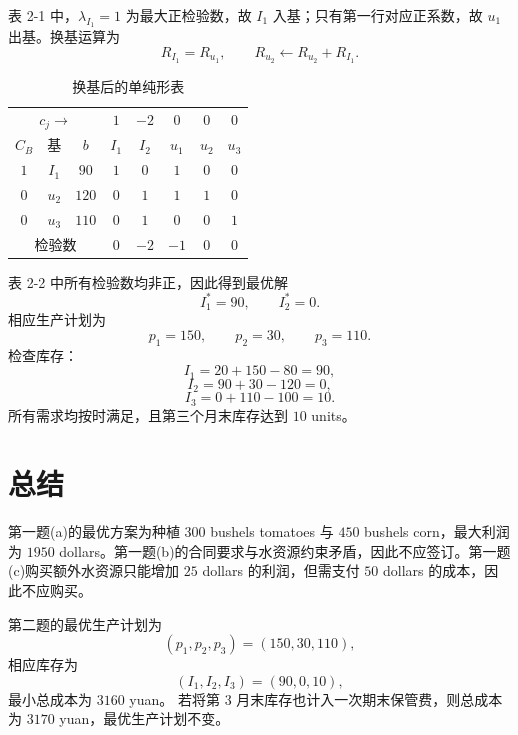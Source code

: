﻿\documentclass[UTF8,zihao=-4,fontset=none]{ctexart}
\begin{document}
表 2-1 中，\(\lambda_{I_1}=1\) 为最大正检验数，故 \(I_1\) 入基；只有第一行对应正系数，故 \(u_1\) 出基。换基运算为
\[
    R_{I_1}=R_{u_1},\qquad R_{u_2}\leftarrow R_{u_2}+R_{I_1}.
\]

\begin{table}[H]
\centering
{}
\setlength{\tabcolsep}{4pt}
\caption{换基后的单纯形表}
\begin{tabular}{cccccccc}
\toprule
\multicolumn{3}{c}{$c_j\rightarrow$} & \(1\) & \(-2\) & \(0\) & \(0\) & \(0\)\\
\(C_B\) & 基 & \(b\) & \(I_1\) & \(I_2\) & \(u_1\) & \(u_2\) & \(u_3\)\\
\midrule
\(1\) & \(I_1\) & \(90\)  & \(1\) & \(0\) & \(1\) & \(0\) & \(0\)\\
\(0\) & \(u_2\) & \(120\) & \(0\) & \(1\) & \(1\) & \(1\) & \(0\)\\
\(0\) & \(u_3\) & \(110\) & \(0\) & \(1\) & \(0\) & \(0\) & \(1\)\\
\multicolumn{3}{c}{检验数} & \(0\) & \(-2\) & \(-1\) & \(0\) & \(0\)\\
\bottomrule
\end{tabular}
\end{table}

表 2-2 中所有检验数均非正，因此得到最优解
\[
    I_1^*=90,\qquad I_2^*=0.
\]
相应生产计划为
\[
    p_1=150,\qquad p_2=30,\qquad p_3=110.
\]
检查库存：
\[
    I_1=20+150-80=90,
\]
\[
    I_2=90+30-120=0,
\]
\[
    I_3=0+110-100=10.
\]
所有需求均按时满足，且第三个月末库存达到 \(10\) units。

\section*{总结}

第一题(a)的最优方案为种植 \(300\) bushels tomatoes 与 \(450\) bushels corn，最大利润为 \(1950\) dollars。第一题(b)的合同要求与水资源约束矛盾，因此不应签订。第一题(c)购买额外水资源只能增加 \(25\) dollars 的利润，但需支付 \(50\) dollars 的成本，因此不应购买。

第二题的最优生产计划为
\[
    (p_1,p_2,p_3)=(150,30,110),
\]
相应库存为
\[
    (I_1,I_2,I_3)=(90,0,10),
\]
最小总成本为 \(3160\) yuan。
若将第 \(3\) 月末库存也计入一次期末保管费，则总成本为 \(3170\) yuan，最优生产计划不变。
\end{document}
